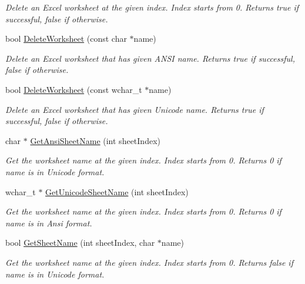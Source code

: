 \begin{DoxyCompactItemize}
\begin{DoxyCompactList}\small\item\em Delete an Excel worksheet at the given index. Index starts from 0. Returns true if successful, false if otherwise. \end{DoxyCompactList}\item 
bool \hyperlink{class_y_excel_1_1_basic_excel_aada082cff09c5c7953a50fa0baef401a}{Delete\+Worksheet} (const char $\ast$name)
\begin{DoxyCompactList}\small\item\em Delete an Excel worksheet that has given A\+N\+S\+I name. Returns true if successful, false if otherwise. \end{DoxyCompactList}\item 
bool \hyperlink{class_y_excel_1_1_basic_excel_a1b9a7b19867acdece16040a2b1002120}{Delete\+Worksheet} (const wchar\+\_\+t $\ast$name)
\begin{DoxyCompactList}\small\item\em Delete an Excel worksheet that has given Unicode name. Returns true if successful, false if otherwise. \end{DoxyCompactList}\item 
char $\ast$ \hyperlink{class_y_excel_1_1_basic_excel_a198689c583a8a481d9bd696126fb191d}{Get\+Ansi\+Sheet\+Name} (int sheet\+Index)
\begin{DoxyCompactList}\small\item\em Get the worksheet name at the given index. Index starts from 0. Returns 0 if name is in Unicode format. \end{DoxyCompactList}\item 
wchar\+\_\+t $\ast$ \hyperlink{class_y_excel_1_1_basic_excel_a45abc548b15b13e8f74f463b29b2ecb4}{Get\+Unicode\+Sheet\+Name} (int sheet\+Index)
\begin{DoxyCompactList}\small\item\em Get the worksheet name at the given index. Index starts from 0. Returns 0 if name is in Ansi format. \end{DoxyCompactList}\item 
bool \hyperlink{class_y_excel_1_1_basic_excel_a8b81fcc702b7c656df90c57c7a04b4ac}{Get\+Sheet\+Name} (int sheet\+Index, char $\ast$name)
\begin{DoxyCompactList}\small\item\em Get the worksheet name at the given index. Index starts from 0. Returns false if name is in Unicode format. \end{DoxyCompactList}\item 

\end{DoxyCompactItemize}
